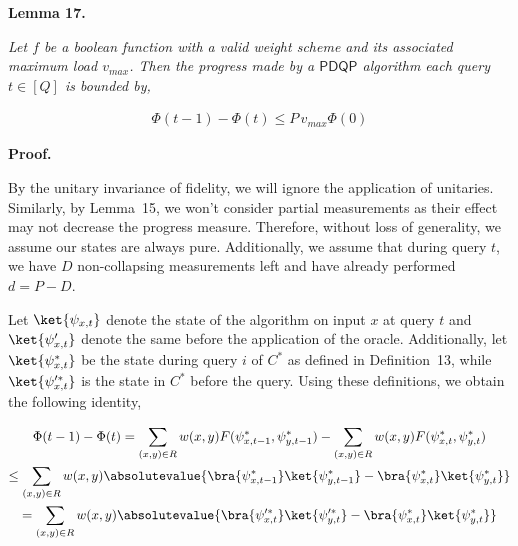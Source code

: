 \documentclass[10pt,a4paper]{article}
\begin{document}


\par\medskip\noindent\textbf{
\textbf{Lemma 17}\textbf{.}
}\par



\emph{Let $f$ be a boolean function with a valid weight scheme and its associated maximum load $v_{max}$. Then the progress made by a $\mathsf{PDQP}$ algorithm each query $t\in[Q]$ is bounded by,}\par


\[\begin{gathered}
\displaystyle\Phi(t-1)-\Phi(t)\leq P\,v_{max}\Phi(0)
\end{gathered}\]







\par\medskip\noindent\textbf{Proof.}\par




By the unitary invariance of fidelity, we will ignore the application of unitaries. Similarly, by Lemma 15, we won’t consider partial measurements as their effect may not decrease the progress measure. Therefore, without loss of generality, we assume our states are always pure. Additionally, we assume that during query $t$, we have $D$ non-collapsing measurements left and have already performed $d=P-D$.\par




Let $\ket{\psi_{x,t}}$ denote the state of the algorithm on input $x$ at query $t$ and $\ket{\psi_{x,t}^{\prime}}$ denote the same before the application of the oracle. Additionally, let $\ket{\psi_{x,t}^{*}}$ be the state during query $i$ of $C^{*}$ as defined in Definition 13, while $\ket{\psi_{x,t}^{\prime*}}$ is the state in $C^{*}$ before the query. Using these definitions, we obtain the following identity,\par


\[\begin{gathered}
\displaystyle\Phi(t-1)-\Phi(t) \displaystyle=\sum_{(x,y)\in R}w(x,y)F(\psi_{x,t-1}^{*},\psi_{y,t-1}^{*})-\sum_{(x,y)\in R}w(x,y)F(\psi_{x,t}^{*},\psi_{y,t}^{*}) \\
\displaystyle\leq\sum_{(x,y)\in R}w(x,y)\absolutevalue{\bra{\psi_{x,t-1}^{*}}\ket{\psi_{y,t-1}^{*}}-\bra{\psi_{x,t}^{*}}\ket{\psi_{y,t}^{*}}} \\
\displaystyle=\sum_{(x,y)\in R}w(x,y)\absolutevalue{\bra{\psi_{x,t}^{\prime*}}\ket{\psi_{y,t}^{\prime*}}-\bra{\psi_{x,t}^{*}}\ket{\psi_{y,t}^{*}}}
\end{gathered}\]
\end{document}
